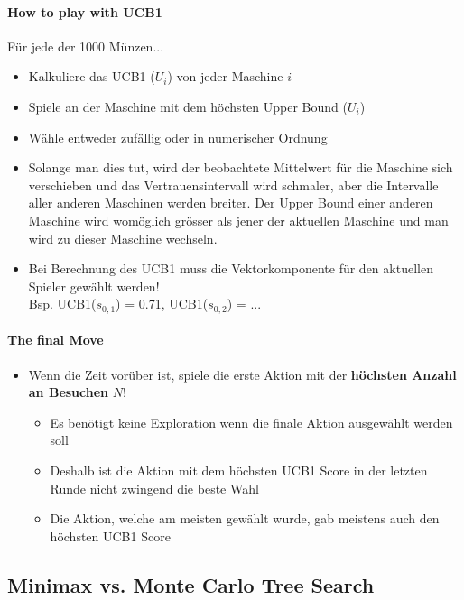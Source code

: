 \documentclass[a4paper]{article}
\begin{document}
		\paragraph{How to play with UCB1}
		Für jede der 1000 Münzen...
		\begin{itemize}
			\item Kalkuliere das UCB1 ($U_{i}$) von jeder Maschine $i$
			\item Spiele an der Maschine mit dem höchsten Upper Bound ($U_{i}$)
			\item Wähle entweder zufällig oder in numerischer Ordnung
			\item Solange man dies tut, wird der beobachtete Mittelwert für die Maschine sich verschieben und das Vertrauensintervall wird schmaler, aber die Intervalle aller anderen Maschinen werden breiter.
			Der Upper Bound einer anderen Maschine wird womöglich grösser als jener der aktuellen Maschine und man wird zu dieser Maschine wechseln.
			\item Bei Berechnung des UCB1 muss die Vektorkomponente für den aktuellen Spieler gewählt werden! \\
				Bsp. UCB1($s_{0,1}$) = 0.71, UCB1($s_{0,2}$) = ...
		\end{itemize}
	
		\paragraph{The final Move}
		
		\begin{itemize}
			\item Wenn die Zeit vorüber ist, spiele die erste Aktion mit der \textbf{höchsten Anzahl an Besuchen }$N$!
			\begin{itemize}
				\item Es benötigt keine Exploration wenn die finale Aktion ausgewählt werden soll
				\item Deshalb ist die Aktion mit dem höchsten UCB1 Score in der letzten Runde nicht zwingend die beste Wahl
				\item Die Aktion, welche am meisten gewählt wurde, gab meistens auch den höchsten UCB1 Score
			\end{itemize} 
		\end{itemize}
		
		\subsection{Minimax vs. Monte Carlo Tree Search}
		
\end{document}
